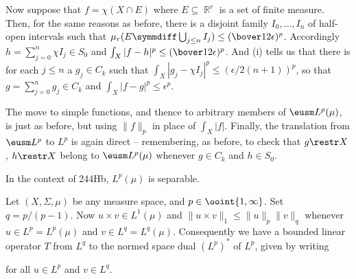 { Now suppose that $f=\chi(X\cap E)$ where
$E\subseteq\BbbR^r$ is a
set of finite measure.   Then, for the same reasons as before, there is
a disjoint family
$I_0,\ldots,I_n$ of half-open intervals such that
$\mu_r(E\symmdiff\bigcup_{j\le n}I_j)\le(\bover12\epsilon)^p$.
Accordingly $h=\sum_{j=0}^n\chi I_j\in S_0$ and
$\int_X|f-h|^p\le(\bover12\epsilon)^p$.
And (i) tells us that there is for each
$j\le n$ a $g_j\in C_k$ such that
$\int_X|g_j-\chi I_j|^p\le(\epsilon/2(n+1))^p$, so that
$g=\sum_{j=0}^ng_j\in C_k$ and $\int_X|f-g|^p\le\epsilon^p$.

\medskip

 The move to simple functions, and thence to arbitrary
members of $\eusm L^p(\mu)$, is just as before, but using $\|f\|_p$ in
place of $\int_X|f|$.   Finally, the translation from $\eusm L^p$ to
$L^p$ is again direct -- remembering, as before, to check that
$g\restr X$, $h\restr X$ belong to $\eusm L^p(\mu)$ whenever
$g\in C_k$ and $h\in S_0$.
}%

 In the context of 244Hb, $L^p(\mu)$ is
separable.


 Let $(X,\Sigma,\mu)$ be any
measure space, and $p\in\ooint{1,\infty}$.
Set $q=p/(p-1)$.   Now
$u\times v\in L^1(\mu)$ and $\|u\times v\|_1\le\|u\|_p\|v\|_q$ whenever
$u\in L^p=L^p(\mu)$ and $v\in L^q=L^q(\mu)$.
Consequently we have a bounded linear operator $T$ from $L^q$
to the normed space dual $(L^p)^*$ of $L^p$, given by writing


\noindent for all $u\in L^p$ and $v\in L^q$.

